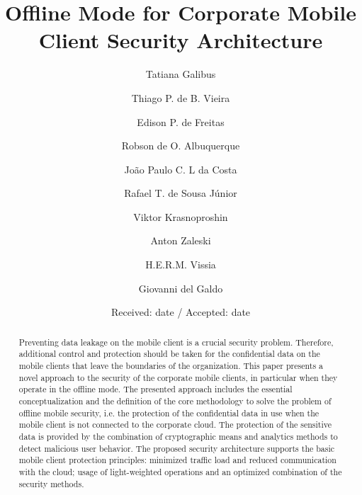 \documentclass[twocolumn]{svjour3}          	%
\begin{document}
\title{Offline Mode for Corporate Mobile Client Security Architecture}

\author{Tatiana Galibus				\and
        Thiago P. de B. Vieira		\and
        	Edison P. de Freitas			\and
        	Robson de O. Albuquerque		\and
        	João Paulo C. L da Costa		\and
        	Rafael T. de Sousa Júnior	\and
        Viktor Krasnoproshin			\and
        	Anton Zaleski				\and
        	H.E.R.M. Vissia				\and
        	Giovanni del Galdo
}


\date{Received: date / Accepted: date}

\maketitle

\begin{abstract}
Preventing data leakage on the mobile client is a crucial security problem. Therefore, additional control and protection should be taken for the confidential data on the mobile clients that leave the boundaries of the organization. This paper presents a novel approach to the security of the corporate mobile clients, in particular when they operate in the offline mode. The presented approach includes the essential conceptualization and the definition of the core methodology to solve the problem of offline mobile security, i.e. the protection of the confidential data in use when the mobile client is not connected to the corporate cloud. The protection of the sensitive data is provided by the combination of cryptographic means and analytics methods to detect malicious user behavior. The proposed security architecture supports the basic mobile client protection principles: minimized traffic load and reduced communication with the cloud; usage of light-weighted operations and an optimized combination of the security methods.
\end{abstract}
\end{document}
